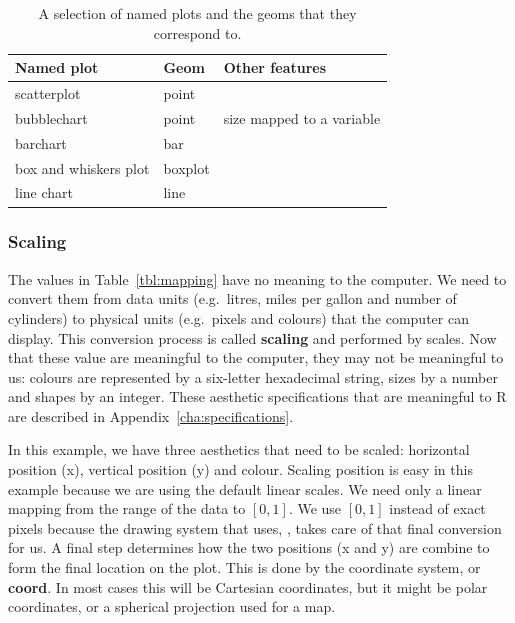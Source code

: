 \begin{table}
  \begin{center}
  \begin{tabular}{lll}
    \toprule 
    Named plot & Geom & Other features \\
    \midrule
    scatterplot & point &  \\
    bubblechart & point & size mapped to a variable \\ 
    barchart & bar &  \\
    box and whiskers plot & boxplot &  \\
    line chart & line &  \\     
    \bottomrule
  \end{tabular}
  \end{center}
  \caption{A selection of named plots and the geoms that they correspond to.}
  \label{tbl:named-plots}
\end{table}

% 


\subsubsection{Scaling} 

The values in Table~\ref{tbl:mapping} have no meaning to the computer. We need to convert them from data units (e.g.\ litres, miles per gallon and number of cylinders) to physical units (e.g.\ pixels and colours) that the computer can display. This conversion process is called {\bf scaling} and performed by scales. Now that these value are meaningful to the computer, they may not be meaningful to us: colours are represented by a six-letter hexadecimal string, sizes by a number and shapes by an integer.  These aesthetic specifications that are meaningful to R are described in Appendix~\ref{cha:specifications}.

In this example, we have three aesthetics that need to be scaled: horizontal position (x), vertical position (y) and colour. Scaling position is easy in this example because we are using the default linear scales. We need only a linear mapping from the range of the data to $[0, 1]$. We use $[0, 1]$ instead of exact pixels because the drawing system that \ggplot uses, , takes care of that final conversion for us. A final step determines how the two positions (x and y) are combine to form the final location on the plot. This is done by the coordinate system, or {\bf coord}. In most cases this will be Cartesian coordinates, but it might be polar coordinates, or a spherical projection used for a map.


